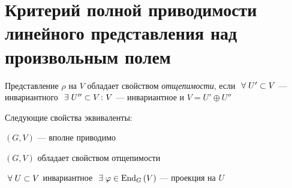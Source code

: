 \section{Критерий полной приводимости линейного представления над произвольным полем}
\begin{df}
	Представление $\rho$ на $V$ обладает свойством \textit{отщепимости},
	если $~\forall\; U' \subset V$ --- инвариантного $~\exists\; U'' \subset V \colon V$ --- инвариантное
	и $V = U' \oplus U''$
\end{df}
\begin{stm}
	Следующие свойства эквиваленты:
	\begin{points}{-3}
		\item $(G, V)$ --- вполне приводимо
		\item $(G, V)$ обладает свойством отщепимости
		\item\label{FSC3} $~\forall\; U \subset V$ инвариантное $~\exists\; \varphi \in \operatorname{End}_G\left(V\right)$ --- проекция на $U$ 
	\end{points}
\end{stm}
